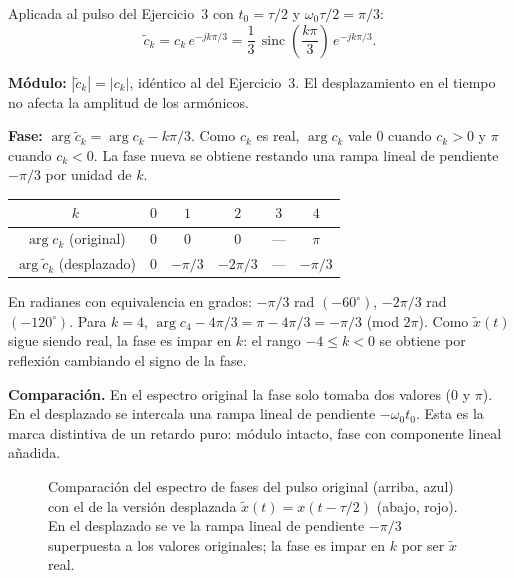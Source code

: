 \documentclass[10pt,a4paper]{article}
\begin{document}
	Aplicada al pulso del Ejercicio~3 con $t_0 = \tau/2$ y $\omega_0\tau/2 = \pi/3$:
	\[
		\boxed{\tilde{c}_k = c_k\,e^{-jk\pi/3} = \frac{1}{3}\,\operatorname{sinc}\!\left(\frac{k\pi}{3}\right)\,e^{-jk\pi/3}.}
	\]

	\textbf{Módulo:} $|\tilde{c}_k| = |c_k|$, idéntico al del Ejercicio~3. El desplazamiento en el tiempo no afecta la amplitud de los armónicos.

	\textbf{Fase:} $\arg \tilde{c}_k = \arg c_k - k\pi/3$. Como $c_k$ es real, $\arg c_k$ vale $0$ cuando $c_k > 0$ y $\pi$ cuando $c_k < 0$. La fase nueva se obtiene restando una rampa lineal de pendiente $-\pi/3$ por unidad de $k$.

	\begin{center}
		\begin{tabular}{c|ccccc}
			$k$ & $0$ & $1$ & $2$ & $3$ & $4$ \\ \hline
			$\arg c_k$ (original) & $0$ & $0$ & $0$ & --- & $\pi$ \\
			$\arg \tilde{c}_k$ (desplazado) & $0$ & $-\pi/3$ & $-2\pi/3$ & --- & $-\pi/3$
		\end{tabular}
	\end{center}

	En radianes con equivalencia en grados: $-\pi/3$ rad $(-60^\circ)$, $-2\pi/3$ rad $(-120^\circ)$. Para $k = 4$, $\arg c_4 - 4\pi/3 = \pi - 4\pi/3 = -\pi/3$ (mod $2\pi$). Como $\tilde{x}(t)$ sigue siendo real, la fase es impar en $k$: el rango $-4 \leq k < 0$ se obtiene por reflexión cambiando el signo de la fase.

	\textbf{Comparación.} En el espectro original la fase solo tomaba dos valores ($0$ y $\pi$). En el desplazado se intercala una rampa lineal de pendiente $-\omega_0 t_0$. Esta es la marca distintiva de un retardo puro: módulo intacto, fase con componente lineal añadida.

	\begin{figure}[H]
		\centering
		
		\caption{Comparación del espectro de fases del pulso original (arriba, azul) con el de la versión desplazada $\tilde{x}(t) = x(t - \tau/2)$ (abajo, rojo). En el desplazado se ve la rampa lineal de pendiente $-\pi/3$ superpuesta a los valores originales; la fase es impar en $k$ por ser $\tilde{x}$ real.}
		\label{fig:ej6}
	\end{figure}

\end{document}
